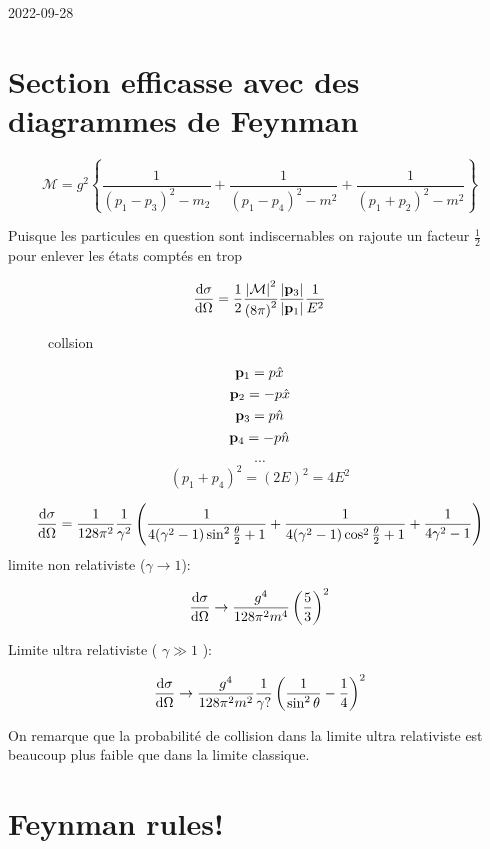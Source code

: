 


2022-09-28


\section*{Section efficasse avec des diagrammes de Feynman}


$$\mathcal{M} = g^{2}\left\{ \frac{1}{\left( p_1 - p_3  \right) ^2 -m_2} + \frac{1}{\left( p_1 - p_4 \right)^2 - m^2 } + \frac{1}{\left( p_1 + p_2 \right)^2 -m^2 }   \right\} $$ 


Puisque les particules en question sont indiscernables on rajoute un facteur $\frac{1}{2} $ pour enlever les états comptés en trop


$$\dv{\sigma}{\Omega} = \frac{1}{2} \frac{{\abs{\mathcal{M} }}^{2}}{\left( 8\pi \right)^2} \frac{\abs{\vb{p}_3} }{\abs{\vb{p}_1} } \frac{1}{E^2}  $$ 


\begin{figure}[ht]
    \centering
    \caption{collsion}
    \label{fig:collsion}
\end{figure}


$$\vb{p}_1 = p \hat x$$ 
$$\vb{p}_2 = -p \hat x$$ 
$$\vb{p}_3 = p \hat n$$ 
$$\vb{p}_4 = -p \hat n $$ 


$$\dotsb$$ 
$$\left( p_1 + p_4 \right)^2 = (2E)^2 = 4 E^2$$ 


$$\dv{\sigma}{\Omega} = \frac{1}{128\pi^{2}} \frac{1}{\gamma^2}  \left( \frac{1}{4(\gamma^{2}-1 ) \sin^{2}\frac{\theta}{2} +1}  + \frac{1}{4(\gamma^{2}-1 ) \cos^{2}\frac{\theta}{2} +1} + \frac{1}{4\gamma^{2}-1}  \right) $$ 
limite non relativiste ($\gamma \to 1$):

$$\dv{\sigma}{\Omega} \to \frac{g^{4}}{12 8 \pi^{2}m^4} \left( \frac{5}{3}  \right) ^2 $$ 


Limite ultra relativiste ( $\gamma \gg 1$  ):

$$\dv{\sigma}{\Omega} \to \frac{g^4}{128\pi^{2}m^2} \frac{1}{\gamma?} \left( \frac{1}{\sin^2\theta} - \frac{1}{4}  \right)^2  $$ 

On remarque que la probabilité de collision dans la limite ultra relativiste est beaucoup plus faible que dans la limite classique.


\section*{Feynman rules!}

